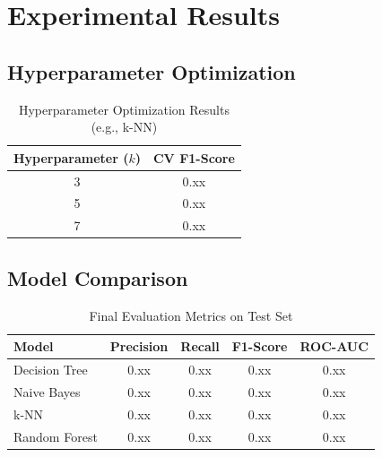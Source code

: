 \section{Experimental Results}

\subsection{Hyperparameter Optimization}

\begin{table}[htbp]
\caption{Hyperparameter Optimization Results (e.g., k-NN)}
\begin{center}
\begin{tabular}{|c|c|}
\hline
\textbf{Hyperparameter ($k$)} & \textbf{CV F1-Score} \\
\hline
3 & 0.xx \\
5 & 0.xx \\
7 & 0.xx \\
\hline
\end{tabular}
\label{tab:hyperparams}
\end{center}
\end{table}

\subsection{Model Comparison}

\begin{table}[htbp]
\caption{Final Evaluation Metrics on Test Set}
\begin{center}
\begin{tabular}{|l|c|c|c|c|}
\hline
\textbf{Model} & \textbf{Precision} & \textbf{Recall} & \textbf{F1-Score} & \textbf{ROC-AUC} \\
\hline
Decision Tree & 0.xx & 0.xx & 0.xx & 0.xx \\
Naive Bayes & 0.xx & 0.xx & 0.xx & 0.xx \\
k-NN & 0.xx & 0.xx & 0.xx & 0.xx \\
Random Forest & 0.xx & 0.xx & 0.xx & 0.xx \\
\hline
\end{tabular}
\label{tab:final_metrics}
\end{center}
\end{table}

